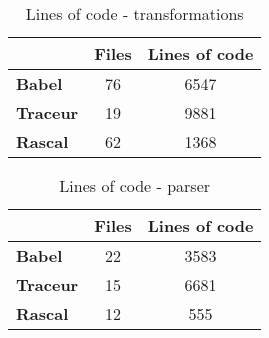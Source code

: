 \begin{minipage}{0.45\linewidth}
\begin{table}
\centering
\caption{Lines of code - transformations}
\label{loc-transformations}
\begin{tabular}{@{}lcc@{}}
\toprule
              & {\bf Files} & \multicolumn{1}{l}{{\bf Lines of code}} \\ \midrule
{\bf Babel}   & 76          & 6547                                    \\
{\bf Traceur} & 19          & 9881                                    \\
{\bf Rascal}  & 62          & 1368                                    \\ \bottomrule
\end{tabular}
\end{table}
\end{minipage}
\hspace
\begin{minipage}{0.45\linewidth}
\begin{table}
\centering
\caption{Lines of code - parser}
\label{loc-parser}
\begin{tabular}{@{}lcc@{}}
\toprule
              & {\bf Files} & \multicolumn{1}{l}{{\bf Lines of code}} \\ \midrule
{\bf Babel}   & 22          & 3583                                    \\
{\bf Traceur} & 15          & 6681                                    \\
{\bf Rascal}  & 12          & 555                                    \\ \bottomrule
\end{tabular}
\end{table}
\end{minipage}

